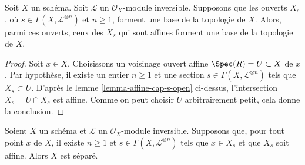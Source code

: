 \begin{lemma}
\label{lemma-affine-s-opens}
Soit $X$ un schéma. Soit $\mathcal{L}$ un $\mathcal{O}_X$-module inversible.
Supposons que les ouverts $X_s$, où $s \in \Gamma(X, \mathcal{L}^{\otimes n})$
et $n \geq 1$, forment une base de la topologie de $X$.
Alors, parmi ces ouverts, ceux des $X_s$ qui sont affines
forment une base de la topologie de $X$.
\end{lemma}

\begin{proof}
Soit $x \in X$. Choisissons un voisinage ouvert affine
$\Spec(R) = U \subset X$ de $x$.
Par hypothèse, il existe
un entier $n \geq 1$ et une section $s \in \Gamma(X, \mathcal{L}^{\otimes n})$
tels que $X_s \subset U$. D'après le lemme \ref{lemma-affine-cap-s-open} ci-dessus,
l'intersection $X_s = U \cap X_s$ est affine.
Comme on peut choisir $U$ arbitrairement petit, cela donne la conclusion.
\end{proof}

\begin{lemma}
\label{lemma-affine-s-opens-cover-quasi-separated}
Soient $X$ un schéma et $\mathcal{L}$ un $\mathcal{O}_X$-module inversible.
Supposons que, pour tout point $x$ de $X$, il existe $n \geq 1$ et
$s \in \Gamma(X, \mathcal{L}^{\otimes n})$ tels que
$x \in X_s$ et que $X_s$ soit affine. Alors $X$ est séparé.
\end{lemma}

